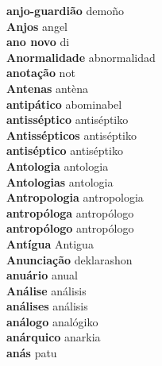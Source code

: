 \textbf{ anjo-guardião  } demoño \\
\textbf{ Anjos  } angel \\
\textbf{ ano novo  } di \\
\textbf{ Anormalidade  } abnormalidad \\
\textbf{ anotação  } not \\
\textbf{ Antenas  } antèna \\
\textbf{ antipático  } abominabel \\
\textbf{ antisséptico  } antiséptiko \\
\textbf{ Antissépticos  } antiséptiko \\
\textbf{ antiséptico  } antiséptiko \\
\textbf{ Antologia  } antologia \\
\textbf{ Antologias  } antologia \\
\textbf{ Antropologia  } antropologia \\
\textbf{ antropóloga  } antropólogo \\
\textbf{ antropólogo  } antropólogo \\
\textbf{ Antígua  } Antigua \\
\textbf{ Anunciação  } deklarashon \\
\textbf{ anuário  } anual \\
\textbf{ Análise  } análisis \\
\textbf{ análises  } análisis \\
\textbf{ análogo  } analógiko \\
\textbf{ anárquico  } anarkia \\
\textbf{ anás  } patu \\
